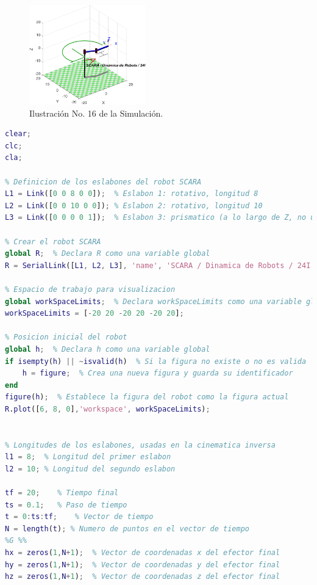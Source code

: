 \documentclass[final]{foresj}
\begin{document}
\begin{figure}[h!]
\centering
\includegraphics[width=0.45\textwidth]{GHAF.png}
\caption{Ilustración No. 16 de la Simulación.}
\label{fig:my_label}
\end{figure}

\begin{lstlisting}[language=Matlab]
% Limpiar todas las variables, consola y objetos de graficas
clear;
clc;
cla;

% Definicion de los eslabones del robot SCARA
L1 = Link([0 0 8 0 0]);  % Eslabon 1: rotativo, longitud 8
L2 = Link([0 0 10 0 0]); % Eslabon 2: rotativo, longitud 10
L3 = Link([0 0 0 0 1]);  % Eslabon 3: prismatico (a lo largo de Z, no usado aqui)

% Crear el robot SCARA
global R;  % Declara R como una variable global
R = SerialLink([L1, L2, L3], 'name', 'SCARA / Dinamica de Robots / 24I');

% Espacio de trabajo para visualizacion
global workSpaceLimits;  % Declara workSpaceLimits como una variable global
workSpaceLimits = [-20 20 -20 20 -20 20];

% Posicion inicial del robot
global h;  % Declara h como una variable global
if isempty(h) || ~isvalid(h)  % Si la figura no existe o no es valida
    h = figure;  % Crea una nueva figura y guarda su identificador
end
figure(h);  % Establece la figura del robot como la figura actual
R.plot([6, 8, 0],'workspace', workSpaceLimits);


% Longitudes de los eslabones, usadas en la cinematica inversa
l1 = 8;  % Longitud del primer eslabon
l2 = 10; % Longitud del segundo eslabon

tf = 20;    % Tiempo final
ts = 0.1;   % Paso de tiempo
t = 0:ts:tf;    % Vector de tiempo
N = length(t); % Numero de puntos en el vector de tiempo
%G %%
hx = zeros(1,N+1);  % Vector de coordenadas x del efector final
hy = zeros(1,N+1);  % Vector de coordenadas y del efector final
hz = zeros(1,N+1);  % Vector de coordenadas z del efector final


\end{lstlisting}
\end{document}
